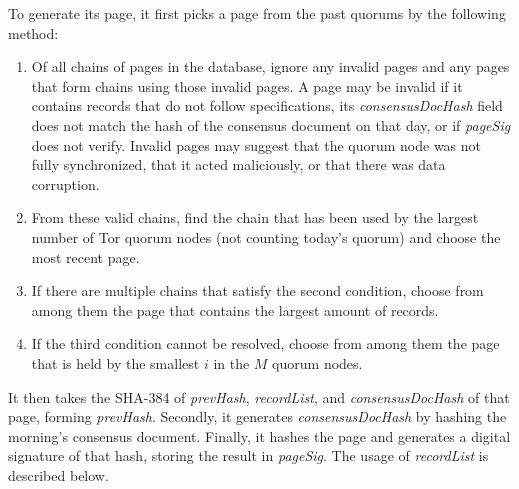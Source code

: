 To generate its page, it first picks a page from the past quorums by the following method:


\begin{enumerate}
	\item Of all chains of pages in the database, ignore any invalid pages and any pages that form chains using those invalid pages. A page may be invalid if it contains records that do not follow specifications, its \emph{consensusDocHash} field does not match the hash of the consensus document on that day, or if \emph{pageSig} does not verify. Invalid pages may suggest that the quorum node was not fully synchronized, that it acted maliciously, or that there was data corruption.
	\item From these valid chains, find the chain that has been used by the largest number of Tor quorum nodes (not counting today's quorum) and choose the most recent page.
	\item If there are multiple chains that satisfy the second condition, choose from among them the page that contains the largest amount of records.
	\item If the third condition cannot be resolved, choose from among them the page that is held by the smallest $ i $ in the $ M $ quorum nodes.
\end{enumerate}

It then takes the SHA-384 of \emph{prevHash}, \emph{recordList}, and \emph{consensusDocHash} of that page, forming \emph{prevHash}. Secondly, it generates \emph{consensusDocHash} by hashing the morning's consensus document. Finally, it hashes the page and generates a digital signature of that hash, storing the result in \emph{pageSig}. The usage of \emph{recordList} is described below.

